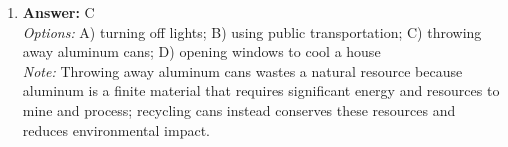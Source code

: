 \documentclass[12pt]{article}
\begin{document}
\begin{enumerate}[label=\arabic*.]
\\ \textit{Note:} The light-year is used as a unit of measure because it represents the vast distances in space, with one light-year equating to about 5.88 trillion miles, making it more practical for expressing the enormous distance of celestial objects like stars. Since 4.3 light-years is a significant distance relative to everyday measurements on Earth, the light-year provides a more comprehensible way to convey that scale.
\item \textbf{Answer:} C
\\ \textit{Options:} A) turning off lights; B) using public transportation; C) throwing away aluminum cans; D) opening windows to cool a house
\\ \textit{Note:} Throwing away aluminum cans wastes a natural resource because aluminum is a finite material that requires significant energy and resources to mine and process; recycling cans instead conserves these resources and reduces environmental impact.
\end{enumerate}
\end{document}
